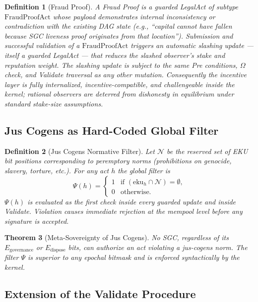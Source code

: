 \documentclass[11pt,a4paper]{article}
\newtheorem{theorem}{Theorem}[section]
\newtheorem{definition}[theorem]{Definition}
\begin{document}
\begin{definition}[Fraud Proof]
A Fraud Proof is a guarded LegalAct of subtype \(\mathrm{FraudProofAct}\) whose payload demonstrates internal inconsistency or contradiction with the existing DAG state (e.g., “capital cannot have fallen because SGC liveness proof originates from that location”). Submission and successful validation of a \(\mathrm{FraudProofAct}\) triggers an automatic slashing update — itself a guarded LegalAct — that reduces the slashed observer’s stake and reputation weight. The slashing update is subject to the same Pre conditions, \(\Omega\) check, and Validate traversal as any other mutation. Consequently the incentive layer is fully internalized, incentive-compatible, and challengeable inside the kernel; rational observers are deterred from dishonesty in equilibrium under standard stake-size assumptions.
\end{definition}




\subsection{Jus Cogens as Hard-Coded Global Filter}

\begin{definition}[Jus Cogens Normative Filter]
Let \(\mathcal{N}\) be the reserved set of EKU bit positions corresponding to peremptory norms (prohibitions on genocide, slavery, torture, etc.). For any act \(h\) the global filter is
\[
\Psi(h) = 
\begin{cases}
1 & \text{if } (\text{eku}_h \cap \mathcal{N}) = \emptyset, \\
0 & \text{otherwise}.
\end{cases}
\]
\(\Psi(h)\) is evaluated as the first check inside every guarded update and inside Validate. Violation causes immediate rejection at the mempool level before any signature is accepted.
\end{definition}

\begin{theorem}[Meta-Sovereignty of Jus Cogens]
No SGC, regardless of its \(E_{\text{governance}}\) or \(E_{\text{dispose}}\) bits, can authorize an act violating a jus-cogens norm. The filter \(\Psi\) is superior to any epochal bitmask and is enforced syntactically by the kernel.
\end{theorem}

\subsection{Extension of the Validate Procedure}
\end{document}
